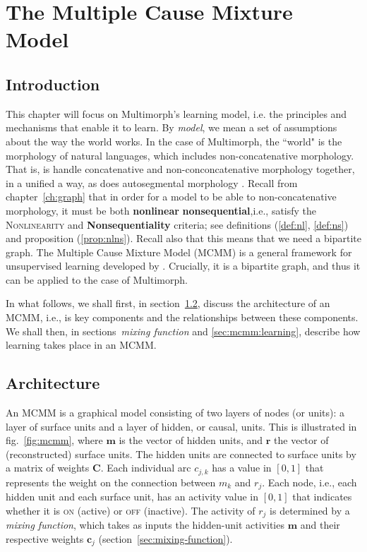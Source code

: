 \chapter{The Multiple Cause Mixture Model}
\label{ch:MCMM}

\section{Introduction}
\label{sec:mcmm:intro}
This chapter will focus on Multimorph's learning model, i.e. the principles and mechanisms that
enable it to learn. By \emph{model}, 
we mean a set of assumptions about the way the world works. In the case of Multimorph, 
the ``world" is the morphology of natural languages, which includes non-concatenative morphology. 
That is, is handle concatenative and non-conconcatenative morphology together, 
in a unified a way, as does
autosegmental morphology \citep{mccarthy:1981}. Recall from chapter~\ref{ch:graph} 
that in order
for a model to be able to non-concatenative morphology, it must be both \textbf{nonlinear}
 \textbf{nonsequential},i.e., satisfy the \textsc{Nonlinearity} and \textbf{Nonsequentiality} 
 criteria; 
 see definitions (\ref{def:nl}, \ref{def:ns}) and 
 proposition (\ref{prop:nlns}). Recall also that this 
 means that we need a bipartite graph. The Multiple Cause Mixture Model (MCMM) is a general 
 framework for unsupervised learning developed by \cite{saund:94}. Crucially, it is 
 a bipartite graph, and thus it can be
applied to the case of Multimorph.  

In what follows, we shall first, in section~\ref{sec:architecture}, discuss the architecture of an \ac{MCMM},
i.e., is key components and the relationships between these components. We shall then, in 
sections~\emph{mixing function} and \ref{sec:mcmm:learning}, describe how
learning takes place in an \ac{MCMM}. 

\section{Architecture}
\label{sec:architecture}
An MCMM is a graphical model consisting of two layers of nodes (or units): a layer 
of surface units 
and a layer of hidden, 
or causal, units. This is illustrated in fig.~\ref{fig:mcmm}, where $\mathbf{m}$ 
is the vector of hidden units, and $\mathbf{r}$ the vector of (reconstructed) surface units.
The hidden units are connected to surface units by a matrix of weights $\mathbf{C}$. 
Each individual arc $c_{j,k}$ has a value in $[0,1]$ that represents the weight on the connection between
$m_k$ and $r_j$.
Each node, i.e., each hidden unit and each surface unit, has an activity value in $[0,1]$ that
indicates whether it is \textsc{on} (active) or \textsc{off} (inactive).
The activity of $r_j$ is determined by a \emph{mixing function}, which takes as inputs the 
hidden-unit activities $\mathbf{m}$ and their respective weights $\mathbf{c}_j$
(section~\ref{sec:mixing-function}).

